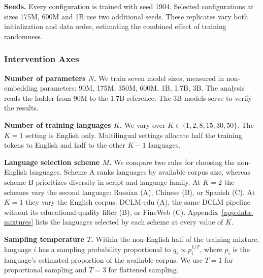 \textbf{Seeds.} Every configuration is trained with seed 1904. Selected configurations at sizes 175M, 600M and 1B use two additional seeds.
These replicates vary both initialization and data order, estimating the combined effect of training randomness.


\subsubsection{Intervention Axes}

\textbf{Number of parameters $N$.} We train seven model sizes, measured in non-embedding parameters: 90M, 175M, 350M, 600M, 1B, 1.7B, 3B.
The analysis reads the ladder from 90M to the 1.7B reference. The 3B models serve to verify the results.

\textbf{Number of training languages $K$.} We vary over $K \in \{1, 2, 8, 15, 30, 50\}$. The $K=1$ setting is English only. Multilingual settings allocate half the training tokens to English and half to the other $K-1$ languages.

\textbf{Language selection scheme $M$.}
We compare two rules for choosing the non-English languages. Scheme A ranks languages by available corpus size, whereas scheme B prioritizes diversity in script and language family.
At $K=2$ the schemes vary the second language: Russian (A), Chinese (B), or Spanish (C). At $K=1$ they vary the English corpus: DCLM-edu (A), the same DCLM pipeline without its educational-quality filter (B), or FineWeb (C).
Appendix~\ref{app:data-mixtures} lists the languages selected by each scheme at every value of $K$.

\textbf{Sampling temperature $T$.}
Within the non-English half of the training mixture, language $i$ has a sampling probability proportional to
$q_i \propto p_i^{1/T}$,
where $p_i$ is the language's estimated proportion of the available corpus. We use $T=1$ for proportional sampling and $T=3$ for flattened sampling.

